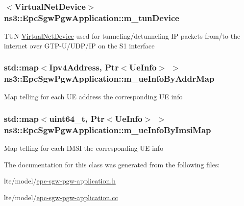 \subsubsection[{\texorpdfstring{m\+\_\+tun\+Device}{m_tunDevice}}]{$<${\bf Virtual\+Net\+Device}$>$ ns3\+::\+Epc\+Sgw\+Pgw\+Application\+::m\+\_\+tun\+Device\hspace{0.3cm}{\ttfamily [private]}}\hypertarget{classns3_1_1EpcSgwPgwApplication_abfd29706464464933ddc5a72469a97e1}{}\label{classns3_1_1EpcSgwPgwApplication_abfd29706464464933ddc5a72469a97e1}
T\+UN \hyperlink{classns3_1_1VirtualNetDevice}{Virtual\+Net\+Device} used for tunneling/detunneling IP packets from/to the internet over G\+T\+P-\/\+U/\+U\+D\+P/\+IP on the S1 interface 
\subsubsection[{\texorpdfstring{m\+\_\+ue\+Info\+By\+Addr\+Map}{m_ueInfoByAddrMap}}]{\setlength{\rightskip}{0pt plus 5cm}std\+::map$<${\bf Ipv4\+Address}, {\bf Ptr}$<${\bf Ue\+Info}$>$ $>$ ns3\+::\+Epc\+Sgw\+Pgw\+Application\+::m\+\_\+ue\+Info\+By\+Addr\+Map\hspace{0.3cm}{\ttfamily [private]}}\hypertarget{classns3_1_1EpcSgwPgwApplication_ac5d167ff997bd9618e832a371f45cba0}{}\label{classns3_1_1EpcSgwPgwApplication_ac5d167ff997bd9618e832a371f45cba0}
Map telling for each UE address the corresponding UE info 
\subsubsection[{\texorpdfstring{m\+\_\+ue\+Info\+By\+Imsi\+Map}{m_ueInfoByImsiMap}}]{\setlength{\rightskip}{0pt plus 5cm}std\+::map$<$uint64\+\_\+t, {\bf Ptr}$<${\bf Ue\+Info}$>$ $>$ ns3\+::\+Epc\+Sgw\+Pgw\+Application\+::m\+\_\+ue\+Info\+By\+Imsi\+Map\hspace{0.3cm}{\ttfamily [private]}}\hypertarget{classns3_1_1EpcSgwPgwApplication_ac026923e4b06703faf659f0584573531}{}\label{classns3_1_1EpcSgwPgwApplication_ac026923e4b06703faf659f0584573531}
Map telling for each I\+M\+SI the corresponding UE info 

The documentation for this class was generated from the following files\+:\begin{DoxyCompactItemize}
\item 
lte/model/\hyperlink{epc-sgw-pgw-application_8h}{epc-\/sgw-\/pgw-\/application.\+h}\item 
lte/model/\hyperlink{epc-sgw-pgw-application_8cc}{epc-\/sgw-\/pgw-\/application.\+cc}\end{DoxyCompactItemize}
